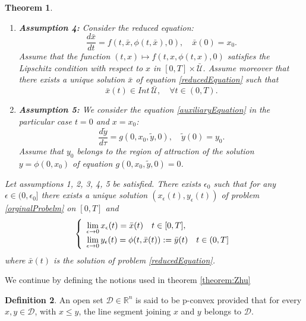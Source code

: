\documentclass{article}
\newtheorem{theorem}{Theorem}
\theoremstyle{definition}
\newtheorem{definition}[theorem]{Definition}
\theoremstyle{remark}
\begin{document}
\begin{appendix}
\begin{theorem}
\begin{enumerate}
\item \textbf{Assumption 4:} 
Consider the reduced equation:
\begin{equation}\label{reducedEquation}
\dfrac{d\bar{x}}{dt} = f(t,\bar{x},\phi(t,\bar{x}), 0), \quad \bar{x}(0) = x_0.
\end{equation}
Assume that the function $(t,x) \mapsto f(t,x,\phi(t,x), 0)$ satisfies the Lipschitz condition with respect to $x$ in $[0, T]\times \mathcal{\bar{U}}$. Assume moreover that there exists a unique solution $\bar{x}$ of equation \eqref{reducedEquation} such that $$\bar{x}(t) \in Int \: \mathcal{\bar{U}}, \quad \forall t \in (0,T).$$

\item \textbf{Assumption 5:} We consider the equation \eqref{auxiliaryEquation} in the particular case $t=0$ and $x = x_0$:
\begin{equation}\label{auxiliaryEquation, 0}
\dfrac{d \tilde{y}}{d \tau} =  g(0, x_0,\tilde{y},0), \quad \tilde{y}(0) = y_0.
\end{equation}
Assume that $y_0$ belongs to the region of attraction of the solution $y = \phi(0, x_0)$ of equation $g(0, x_0,\tilde{y},0) = 0$.
\end{enumerate}

Let assumptions 1, 2, 3, 4, 5 be satisfied. There exists $\epsilon_0$ such that for any $\epsilon \in (0, \epsilon_0]$ there exists a unique solution $(x_\epsilon(t), y_\epsilon(t))$ of problem \eqref{orginalProbelm} on $[0,T]$ and
\begin{equation}
\def\arraystretch{1.2}
\left\lbrace \begin{array}{l}
\lim\limits_{\epsilon \rightarrow 0}{x_\epsilon(t)} = \bar{x}(t) \quad t \in [0,T], \\
\lim\limits_{\epsilon \rightarrow 0} y_\epsilon(t) = \phi(t, \bar{x}(t)) := \bar{y}(t) \quad t \in (0,T] \\
\end{array} \right.
\end{equation}
where $\bar{x}(t)$ is the solution of problem \eqref{reducedEquation}.
\end{theorem}

We continue by defining the notions used in theorem \ref{theorem:Zhu}
\begin{definition}
An open set $\mathcal{D} \in \mathbb{R}^n$ is said to be p-convex provided that for every $x, y \in \mathcal{D}$, with $x \leq y$, the line segment joining $x$ and $y$ belongs to $\mathcal{D}$.
\end{definition}


\end{appendix}
\end{document}
